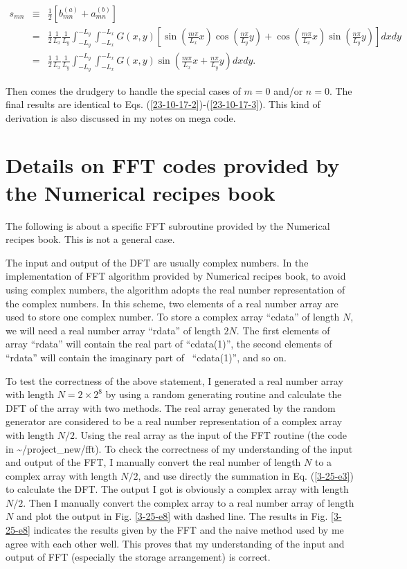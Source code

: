 \documentclass{article}
\begin{document}
\begin{eqnarray}
  s_{m n} & \equiv & \frac{1}{2} [b_{m n}^{(a)} + a_{m n}^{(b)}] \nonumber\\
  & = & \frac{1}{2} \frac{1}{L_x}  \frac{1}{L_y} \int_{- L_y}^{- L_y} \int_{-
  L_x}^{- L_x} G (x, y) \left[ \sin \left( \frac{m \pi}{L_x} x \right) \cos
  \left( \frac{n \pi}{L_y} y \right) + \cos \left( \frac{m \pi}{L_x} x \right)
  \sin \left( \frac{n \pi}{L_y} y \right) \right] d x d y \nonumber\\
  & = & \frac{1}{2} \frac{1}{L_x}  \frac{1}{L_y} \int_{- L_y}^{- L_y} \int_{-
  L_x}^{- L_x} G (x, y) \sin \left( \frac{m \pi}{L_x} x + \frac{n \pi}{L_y} y
  \right) d x d y. 
\end{eqnarray}


Then comes the drudgery to handle the special cases of $m = 0$ and/or $n = 0$.
The final results are identical to Eqs. (\ref{23-10-17-2})-(\ref{23-10-17-3}).
This kind of derivation is also discussed in my notes on mega code.

\section{Details on FFT codes provided by the Numerical recipes
book{\cite{press1992}}}

The following is about a specific FFT subroutine provided by the Numerical
recipes book{\cite{press1992}}. This is not a general case.

The input and output of the DFT are usually complex numbers. In the
implementation of FFT algorithm provided by Numerical recipes
book{\cite{press1992}}, to avoid using complex numbers, the algorithm adopts
the real number representation of the complex numbers. In this scheme, two
elements of a real number array are used to store one complex number. To store
a complex array ``cdata'' of length $N$, we will need a real number array
``rdata'' of length $2 N$. The first elements of array ``rdata'' will contain
the real part of ``cdata(1)'', the second elements of ``rdata'' will contain
the imaginary part of \ ``cdata(1)'', and so on.

To test the correctness of the above statement, I generated a real number
array with length $N = 2 \times 2^8$ by using a random generating routine and
calculate the DFT of the array with two methods. The real array generated by
the random generator are considered to be a real number representation of a
complex array with length $N / 2$. Using the real array as the input of the
FFT routine (the code in \~{}/project\_new/fft). To check the correctness of
my understanding of the input and output of the FFT, I manually convert the
real number of length $N$ to a complex array with length $N / 2$, and use
directly the summation in Eq. (\ref{3-25-e3}) to calculate the DFT. The output
I got is obviously a complex array with length $N / 2$. Then I manually
convert the complex array to a real number array of length $N$ and plot the
output in Fig. \ref{3-25-e8} with dashed line. The results in Fig.
\ref{3-25-e8} indicates the results given by the FFT and the naive method used
by me agree with each other well. This proves that my understanding of the
input and output of FFT (especially the storage arrangement) is correct.
\end{document}
